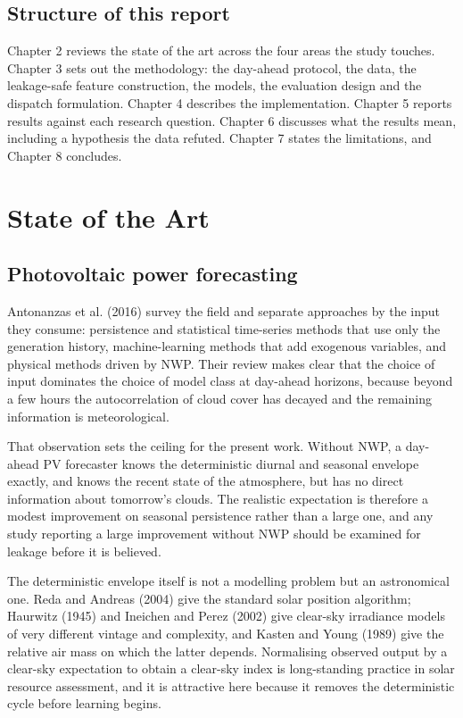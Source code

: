 \documentclass[11pt,a4paper,oneside]{report}
\begin{document}
\section{Structure of this report}

Chapter 2 reviews the state of the art across the four areas the study touches. Chapter 3 sets out the methodology: the day-ahead protocol, the data, the leakage-safe feature construction, the models, the evaluation design and the dispatch formulation. Chapter 4 describes the implementation. Chapter 5 reports results against each research question. Chapter 6 discusses what the results mean, including a hypothesis the data refuted. Chapter 7 states the limitations, and Chapter 8 concludes.


\chapter{State of the Art}

\section{Photovoltaic power forecasting}

Antonanzas et al. (2016) survey the field and separate approaches by the input they consume: persistence and statistical time-series methods that use only the generation history, machine-learning methods that add exogenous variables, and physical methods driven by NWP. Their review makes clear that the choice of input dominates the choice of model class at day-ahead horizons, because beyond a few hours the autocorrelation of cloud cover has decayed and the remaining information is meteorological.

That observation sets the ceiling for the present work. Without NWP, a day-ahead PV forecaster knows the deterministic diurnal and seasonal envelope exactly, and knows the recent state of the atmosphere, but has no direct information about tomorrow's clouds. The realistic expectation is therefore a modest improvement on seasonal persistence rather than a large one, and any study reporting a large improvement without NWP should be examined for leakage before it is believed.

The deterministic envelope itself is not a modelling problem but an astronomical one. Reda and Andreas (2004) give the standard solar position algorithm; Haurwitz (1945) and Ineichen and Perez (2002) give clear-sky irradiance models of very different vintage and complexity, and Kasten and Young (1989) give the relative air mass on which the latter depends. Normalising observed output by a clear-sky expectation to obtain a clear-sky index is long-standing practice in solar resource assessment, and it is attractive here because it removes the deterministic cycle before learning begins.
\end{document}

